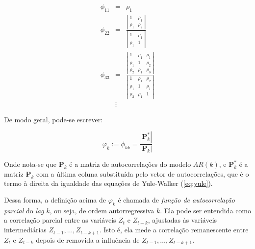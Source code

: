 \[
\begin{array}{rcl}
\phi_{11} & = & \rho_1 \\
\phi_{22} & = & \frac{\left| \begin{array}{cc}1&\rho_1\\\rho_1&\rho_2\end{array} \right|}{\left| \begin{array}{cc}1&\rho_1\\\rho_1&1\end{array} \right|}  \\
\phi_{33} & = & \frac{\left| \begin{array}{ccc}1&\rho_1&\rho_1\\\rho_1&1&\rho_2\\\rho_2&\rho_1&\rho_3\end{array} \right|}{\left| \begin{array}{ccc}1&\rho_1&\rho_2\\\rho_1&1&\rho_1\\\rho_2&\rho_1&1\end{array} \right|}\\
& \vdots &
\end{array}
\]

De modo geral, pode-se escrever:

\begin{equation}\label{defi:parcial}
\varphi_k := \phi_{kk} = \dfrac{|\mathbf{P}_k^{*}|}{|\mathbf{P}_k|}
\end{equation}

Onde nota-se que $\mathbf{P}_k$ é a matriz de autocorrelações do modelo $AR(k)$, e $\mathbf{P}_k^{*}$ é a matriz $\mathbf{P}_k$ com a última coluna substituída pelo vetor de autocorrelações, que é o termo à direita da igualdade das equações de Yule-Walker (\ref{eq:yule}).

Dessa forma, a definição acima de $\varphi_k$ é chamada de \emph{função de autocorrelação parcial} do \emph{lag} $k$, ou seja, de ordem autorregressiva $k$. Ela pode ser entendida como a correlação parcial entre as variáveis $Z_t$  e $Z_{t-k}$, ajustadas às variáveis intermediárias $Z_{t-1}, \ldots, Z_{t-k+1}$. Isto é, ela mede a correlação remanescente entre $Z_t$  e $Z_{t-k}$ depois de removida a influência de $Z_{t-1}, \ldots, Z_{t-k+1}$.